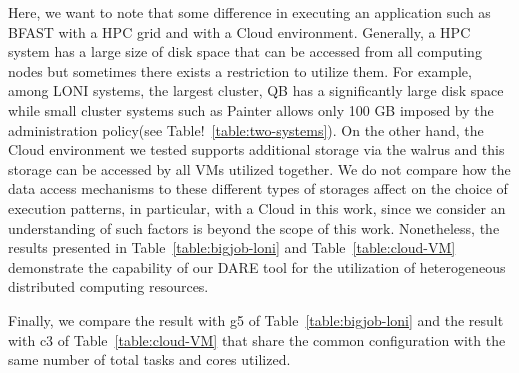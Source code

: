 \documentclass{acm_proc_article-sp}
\begin{document}
Here, we want to note that some difference in executing an application such as BFAST with a HPC grid and with a Cloud environment.  Generally, a HPC system has a large size of disk space that can be accessed from all computing nodes but sometimes there exists a restriction to utilize them.  For example, among LONI systems, the largest cluster, QB has a significantly large disk space while small cluster systems such as Painter allows only 100 GB imposed by the administration policy(see Table!~\ref{table:two-systems}).  On the other hand, the Cloud environment we tested supports additional storage via the walrus and this storage can be accessed by all VMs utilized together. 
We do not compare how the data access mechanisms to these different types of storages affect on the choice of execution patterns, in particular, with a Cloud in this work, since we consider an understanding of such factors is beyond the scope of this work. Nonetheless, the results presented in Table~\ref{table:bigjob-loni} and Table~\ref{table:cloud-VM} demonstrate the capability of our DARE tool for the utilization of heterogeneous distributed computing resources.

Finally, we compare the result with g5 of Table~\ref{table:bigjob-loni} and the result with c3 of Table~\ref{table:cloud-VM} that share the common configuration with the same number of total tasks and cores utilized.





\end{document}
